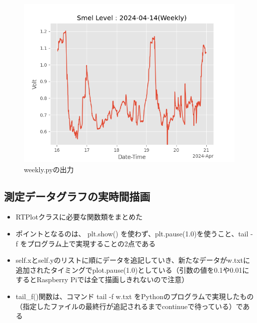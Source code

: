 \documentclass[12pt,a4paper,uplatex]{jsarticle}
\begin{document}
\begin{figure}[htbp]
	\begin{minipage}[b]{1.0\linewidth}
		\centering
		\includegraphics[keepaspectratio, scale=0.8]{figs/png/Weekly_2024-04-14.png}
		\caption{weekly.pyの出力}
	\end{minipage}
\end{figure}

\newpage

\subsection{測定データグラフの実時間描画}

\begin{itemize}
	\item RTPlotクラスに必要な関数類をまとめた
	\item ポイントとなるのは、 plt.show() を使わず、plt.pause(1.0)を使うこと、tail -f をプログラム上で実現することの2点である
	\item self.xとself.yのリストに順にデータを追記していき、新たなデータがw.txtに追加されたタイミングでplot.pause(1.0)としている（引数の値を0.1や0.01にするとRaspberry Piでは全て描画しきれないので注意）
	\item tail\_f()関数は、コマンド tail -f w.txt をPythonのプログラムで実現したもの（指定したファイルの最終行が追記されるまでcontinueで待っている）である
\end{itemize}
\end{document}
